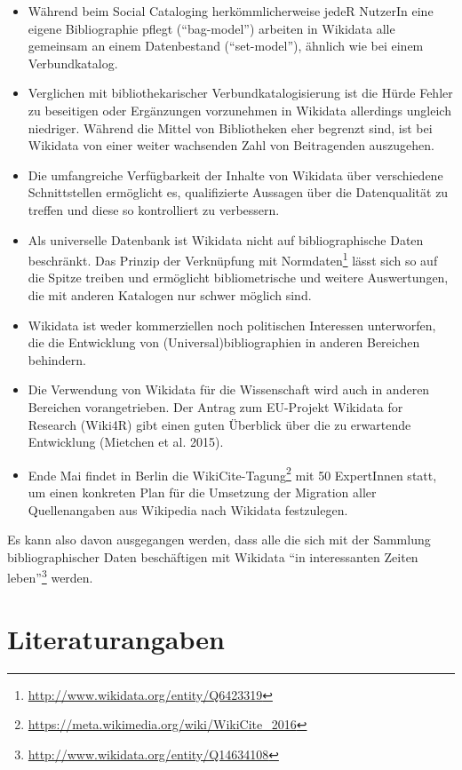 \documentclass[a4paper,
fontsize=11pt,
oneside,
numbers=noperiodatend,
parskip=half-,
bibliography=totoc,
final
]{scrartcl}
\begin{document}
\begin{itemize}
\item
  Während beim Social Cataloging herkömmlicherweise jedeR NutzerIn eine
  eigene Bibliographie pflegt (\enquote{bag-model}) arbeiten in Wikidata
  alle gemeinsam an einem Datenbestand (\enquote{set-model}), ähnlich
  wie bei einem Verbundkatalog.
\item
  Verglichen mit bibliothekarischer Verbundkatalogisierung ist die Hürde
  Fehler zu beseitigen oder Ergänzungen vorzunehmen in Wikidata
  allerdings ungleich niedriger. Während die Mittel von Bibliotheken
  eher begrenzt sind, ist bei Wikidata von einer weiter wachsenden Zahl
  von Beitragenden auszugehen.
\item
  Die umfangreiche Verfügbarkeit der Inhalte von Wikidata über
  verschiedene Schnittstellen ermöglicht es, qualifizierte Aussagen über
  die Datenqualität zu treffen und diese so kontrolliert zu verbessern.
\item
  Als universelle Datenbank ist Wikidata nicht auf bibliographische
  Daten beschränkt. Das Prinzip der Verknüpfung mit Normdaten\footnote{\url{http://www.wikidata.org/entity/Q6423319}}
  lässt sich so auf die Spitze treiben und ermöglicht bibliometrische
  und weitere Auswertungen, die mit anderen Katalogen nur schwer möglich
  sind.
\item
  Wikidata ist weder kommerziellen noch politischen Interessen
  unterworfen, die die Entwicklung von (Universal)bibliographien in
  anderen Bereichen behindern.
\item
  Die Verwendung von Wikidata für die Wissenschaft wird auch in anderen
  Bereichen vorangetrieben. Der Antrag zum EU-Projekt Wikidata for
  Research (Wiki4R) gibt einen guten Überblick über die zu erwartende
  Entwicklung (Mietchen et al. 2015).
\item
  Ende Mai findet in Berlin die WikiCite-Tagung\footnote{\url{https://meta.wikimedia.org/wiki/WikiCite_2016}}
  mit 50 ExpertInnen statt, um einen konkreten Plan für die Umsetzung
  der Migration aller Quellenangaben aus Wikipedia nach Wikidata
  festzulegen.
\end{itemize}

Es kann also davon ausgegangen werden, dass alle die sich mit der
Sammlung bibliographischer Daten beschäftigen mit Wikidata \enquote{in
interessanten Zeiten leben}\footnote{\url{http://www.wikidata.org/entity/Q14634108}}
werden.

\section*{Literaturangaben}\label{literaturangaben}
\end{document}
